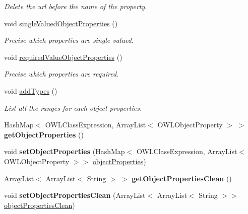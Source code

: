 \begin{DoxyCompactItemize}
\begin{DoxyCompactList}\small\item\em Delete the url before the name of the property. \end{DoxyCompactList}\item 
void \hyperlink{class_ontology_1_1_object_property_a3702e401dd6bda37cbdc5b47ec920d97}{singleValuedObjectProperties} ()
\begin{DoxyCompactList}\small\item\em Precise which properties are single valued. \end{DoxyCompactList}\item 
void \hyperlink{class_ontology_1_1_object_property_af41f2735c1ae3439a2b376a5f15dc2bb}{requiredValueObjectProperties} ()
\begin{DoxyCompactList}\small\item\em Precise which properties are required. \end{DoxyCompactList}\item 
void \hyperlink{class_ontology_1_1_object_property_a350adfd0db702a93b9bd34f8a1fb7191}{addTypes} ()
\begin{DoxyCompactList}\small\item\em List all the ranges for each object properties. \end{DoxyCompactList}\item 
\hypertarget{class_ontology_1_1_object_property_aa583fe754c2ae3404cb76908b9668f99}{
HashMap$<$ OWLClassExpression, ArrayList$<$ OWLObjectProperty $>$ $>$ {\bfseries getObjectProperties} ()}
\label{class_ontology_1_1_object_property_aa583fe754c2ae3404cb76908b9668f99}

\item 
\hypertarget{class_ontology_1_1_object_property_aefe14841afb0de33eb77f22a2419dd7a}{
void {\bfseries setObjectProperties} (HashMap$<$ OWLClassExpression, ArrayList$<$ OWLObjectProperty $>$$>$ \hyperlink{class_ontology_1_1_object_property_a887a6b686410445bba4c74fa0b650168}{objectProperties})}
\label{class_ontology_1_1_object_property_aefe14841afb0de33eb77f22a2419dd7a}

\item 
\hypertarget{class_ontology_1_1_object_property_a13b3fc665acd7a791d690f5c0e54ba42}{
ArrayList$<$ ArrayList$<$ String $>$ $>$ {\bfseries getObjectPropertiesClean} ()}
\label{class_ontology_1_1_object_property_a13b3fc665acd7a791d690f5c0e54ba42}

\item 
\hypertarget{class_ontology_1_1_object_property_a4d961fb974ca5fdde5ebf02d7f6b9a29}{
void {\bfseries setObjectPropertiesClean} (ArrayList$<$ ArrayList$<$ String $>$$>$ \hyperlink{class_ontology_1_1_object_property_afed9e7e803a7a9a541d1057936b2edaf}{objectPropertiesClean})}
\label{class_ontology_1_1_object_property_a4d961fb974ca5fdde5ebf02d7f6b9a29}


\end{DoxyCompactItemize}
